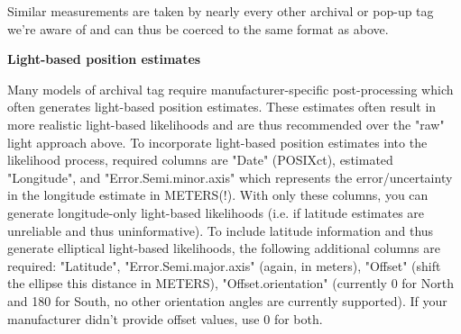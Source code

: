 \documentclass{article}\usepackage[]{graphicx}\usepackage[]{color}
\begin{document}
Similar measurements are taken by nearly every other archival or pop-up tag we're aware of and can thus be coerced to the same format as above.

\vspace{2mm}
\noindent \textbf{Light-based position estimates}

Many models of archival tag require manufacturer-specific post-processing which often generates light-based position estimates. These estimates often result in more realistic light-based likelihoods and are thus recommended over the "raw" light approach above. To incorporate light-based position estimates into the likelihood process, required columns are "Date" (POSIXct), estimated "Longitude", and "Error.Semi.minor.axis" which represents the error/uncertainty in the longitude estimate in METERS(!). With only these columns, you can generate longitude-only light-based likelihoods (i.e. if latitude estimates are unreliable and thus uninformative). To include latitude information and thus generate elliptical light-based likelihoods, the following additional columns are required: "Latitude", "Error.Semi.major.axis" (again, in meters), "Offset" (shift the ellipse this distance in METERS), "Offset.orientation" (currently 0 for North and 180 for South, no other orientation angles are currently supported). If your manufacturer didn't provide offset values, use 0 for both.
\end{document}
